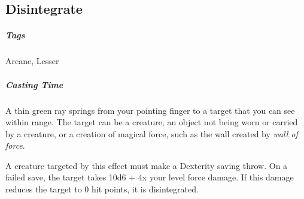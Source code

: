 









\subsection{Disintegrate}
\subparagraph*{Tags} Arcane, Lesser
\subparagraph*{Casting Time}

A thin green ray springs from your pointing finger to a target that you can see within range. The target can be a creature, an object not being worn or carried by a creature, or a creation of magical force, such as the wall created by \textit{wall of force}.

A creature targeted by this effect must make a Dexterity saving throw. On a failed save, the target takes 10d6 + 4x your level force damage. If this damage reduces the target to 0 hit points, it is disintegrated.

